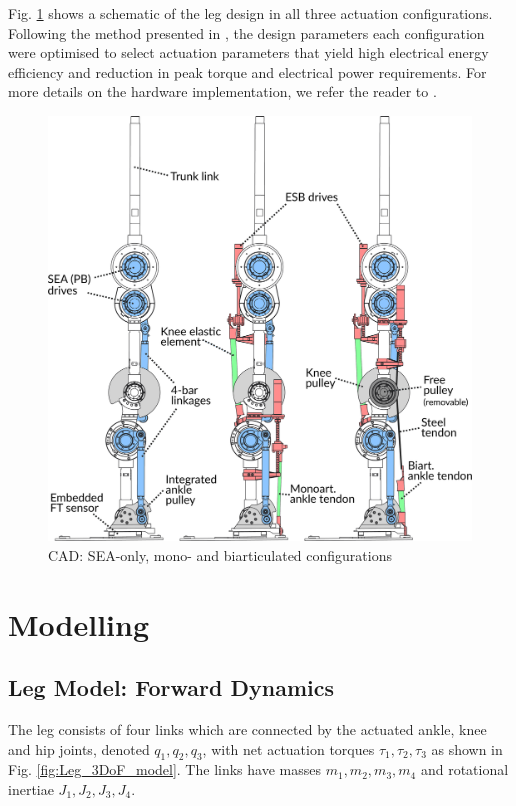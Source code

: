 \documentclass[letterpaper, 10 pt, conference]{ieeeconf}  %
\begin{document}
Fig. \ref{fig:configurations} shows a schematic of the leg design in all three actuation configurations. Following the method presented in \cite{roozing2016design}, the design parameters each configuration were optimised to select actuation parameters that yield high electrical energy efficiency and reduction in peak torque and electrical power requirements. For more details on the hardware implementation, we refer the reader to \cite{roozing_design_2018}.

\begin{figure}[ht]
	\centering
	\includegraphics[width=0.98\linewidth]{cad}
	\caption{CAD: SEA-only, mono- and biarticulated configurations}
	\label{fig:configurations}
\end{figure}


\section{Modelling} 
\label{sec:modelling}

\subsection{Leg Model: Forward Dynamics} 
The leg consists of four links which are connected by the actuated ankle, knee and hip joints, denoted $q_1,q_2,q_3$, with net actuation torques $\tau_1,\tau_2,\tau_3$ as shown in Fig. \ref{fig:Leg_3DoF_model}. The links have masses $m_1,m_2,m_3,m_4$ and rotational inertiae $J_1,J_2,J_3,J_4$.
\end{document}
